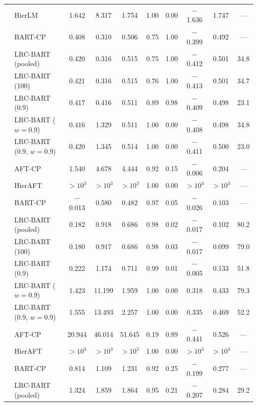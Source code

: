 \documentclass[11pt]{article}
\theoremstyle{definition}
\theoremstyle{plain}
\begin{document}
\begin{center}
\begin{longtable}{llcccccccc}
& HierLM & 1.642 & 8.317 & 1.754 & 1.00 & 0.00 & $-$1.636 & 1.747 & --- \\
& BART-CP & 0.408 & 0.310 & 0.506 & 0.75 & 1.00 & $-$0.399 & 0.492 & --- \\
& LRC-BART (pooled) & 0.420 & 0.316 & 0.515 & 0.75 & 1.00 & $-$0.412 & 0.501 & 34.8 \\
& LRC-BART (100) & 0.421 & 0.316 & 0.515 & 0.76 & 1.00 & $-$0.413 & 0.501 & 34.7 \\
& LRC-BART (0.9) & 0.417 & 0.416 & 0.511 & 0.89 & 0.98 & $-$0.409 & 0.498 & 23.1 \\
& LRC-BART ($w=0.9$) & 0.416 & 1.329 & 0.511 & 1.00 & 0.00 & $-$0.408 & 0.498 & 34.8 \\
& LRC-BART (0.9, $w=0.9$) & 0.420 & 1.345 & 0.514 & 1.00 & 0.00 & $-$0.411 & 0.500 & 23.0 \\
\midrule
{} & AFT-CP & 1.540 & 4.678 & 4.444 & 0.92 & 0.15 & $-$0.006 & 0.204 & --- \\
& HierAFT & $>\!10^{3}$ & $>\!10^{3}$ & $>\!10^{3}$ & 1.00 & 0.00 & $>\!10^{3}$ & $>\!10^{3}$ & --- \\
& BART-CP & $-$0.013 & 0.580 & 0.482 & 0.97 & 0.05 & $-$0.026 & 0.103 & --- \\
& LRC-BART (pooled) & 0.182 & 0.918 & 0.686 & 0.98 & 0.02 & $-$0.017 & 0.102 & 80.2 \\
& LRC-BART (100) & 0.180 & 0.917 & 0.686 & 0.98 & 0.03 & $-$0.017 & 0.099 & 79.0 \\
& LRC-BART (0.9) & 0.222 & 1.174 & 0.711 & 0.99 & 0.01 & $-$0.005 & 0.133 & 51.8 \\
& LRC-BART ($w=0.9$) & 1.423 & 11.199 & 1.959 & 1.00 & 0.00 & 0.318 & 0.433 & 79.3 \\
& LRC-BART (0.9, $w=0.9$) & 1.555 & 13.493 & 2.257 & 1.00 & 0.00 & 0.335 & 0.469 & 52.2 \\
\midrule
{} & AFT-CP & 20.944 & 46.014 & 51.645 & 0.19 & 0.89 & $-$0.441 & 0.526 & --- \\
& HierAFT & $>\!10^{3}$ & $>\!10^{3}$ & $>\!10^{3}$ & 1.00 & 0.00 & $>\!10^{3}$ & $>\!10^{3}$ & --- \\
& BART-CP & 0.814 & 1.109 & 1.231 & 0.92 & 0.25 & $-$0.199 & 0.277 & --- \\
& LRC-BART (pooled) & 1.324 & 1.859 & 1.864 & 0.95 & 0.21 & $-$0.207 & 0.284 & 29.2 \\

\end{longtable}
\end{center}
\end{document}
